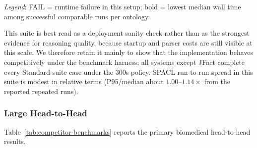 \documentclass[preprint,12pt,times]{elsarticle}
\begin{document}
\begin{table}[htbp]
\centering
\caption{Standard Workload Suite Consistency Benchmark (median wall time across 3 clean runs, ms; timeout 300s; SPACL P95 shown for spread)}
\label{tab:small-workload-suite}
\end{table}
\noindent\footnotesize\textit{Legend}: FAIL = runtime failure in this setup; bold = lowest median wall time among successful comparable runs per ontology.
\normalsize

This suite is best read as a deployment sanity check rather than as the strongest evidence for reasoning quality, because startup and parser costs are still visible at this scale. We therefore retain it mainly to show that the implementation behaves competitively under the benchmark harness; all systems except JFact complete every Standard-suite case under the 300s policy. SPACL run-to-run spread in this suite is modest in relative terms (P95/median about $1.00$--$1.14\times$ from the reported repeated runs).

\subsubsection{Large Head-to-Head}
\label{sec:large-suite-results}

Table~\ref{tab:competitor-benchmarks} reports the primary biomedical head-to-head results.
\end{document}
